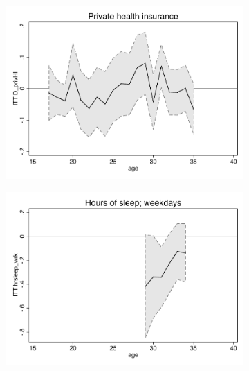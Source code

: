 \documentclass[a4paper ]{article}
\begin{document}
\begin{figure}[p]
\begin{subfigure}[h]{0.48\textwidth}\centering
	\includegraphics[width=\textwidth]{../../analysis/graphs/SOEP/D_privHI_LC.pdf}
\end{subfigure}
\quad
\begin{subfigure}[h]{0.48\textwidth}\centering
	\includegraphics[width=\textwidth]{../../analysis/graphs/SOEP/hrsleep_wrk_LC.pdf}
\end{subfigure}


\end{figure}
\end{document}
